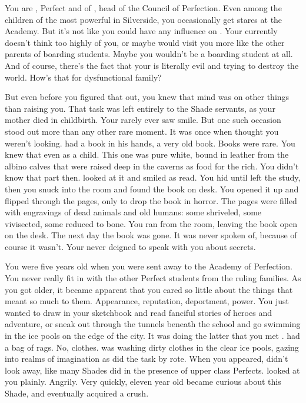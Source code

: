 \documentclass[char]{Silversiders}
\begin{document}
\name{\cTruth{}}

You are \cTruth{}, Perfect and \cTruth{\offspring} of \cDeath{\intro}, head of the Council of Perfection. Even among the children of the most powerful in Silverside, you occasionally get stares at the Academy. But it's not like you could have any influence on \cDeath{\them}. Your \cDeath{\parent} currently doesn't think too highly of you, or maybe \cDeath{\they} would visit you more like the other parents of boarding students. Maybe you wouldn't be a boarding student at all. And of course, there's the fact that your \cDeath{\parent} is literally evil and trying to destroy the world. How's that for dysfunctional family? 

But even before you figured that out, you knew that \cDeath{\their} mind was on other things than raising you. That task was left entirely to the Shade servants, as your mother died in childbirth. Your rarely ever saw \cDeath{\them} smile. But one such occasion stood out more than any other rare moment. It was once when \cDeath{\they} thought you weren't looking. \cDeath{\They} had a book in his hands, a very old book. Books were rare. You knew that even as a child. This one was pure white, bound in leather from the albino calves that were raised deep in the caverns as food for the rich. You didn't know that part then. \cDeath{\They} looked at it and smiled as \cDeath{\they} read. You hid until \cDeath{\they} left the study, then you snuck into the room and found the book on \cDeath{\their} desk. You opened it up and flipped through the pages, only to drop the book in horror. The pages were filled with engravings of dead animals and old humans: some shriveled, some vivisected, some reduced to bone. You ran from the room, leaving the book open on the desk. The next day the book was gone. It was never spoken of, because of course it wasn't. Your \cDeath{\parent} never deigned to speak with you about \cDeath{\their} secrets.

You were five years old when you were sent away to the Academy of Perfection. You never really fit in with the other Perfect students from the ruling families. As you got older, it became apparent that you cared so little about the things that meant so much to them. Appearance, reputation, deportment, power. You just wanted to draw in your sketchbook and read fanciful stories of heroes and adventure, or sneak out through the tunnels beneath the school and go swimming in the ice pools on the edge of the city. It was doing the latter that you met \cWisdom{}. \cWisdom{\They} had a bag of rags. No, clothes. \cWisdom{\They} was washing dirty clothes in the clear ice pools, gazing into realms of imagination as \cWisdom{\they} did the task by rote. When you appeared, \cWisdom{} didn't look away, like many Shades did in the presence of upper class Perfects. \cWisdom{\They} looked at you plainly. Angrily. Very quickly, eleven year old \cTruth{} became curious about this Shade, and eventually acquired a crush.
\end{document}
